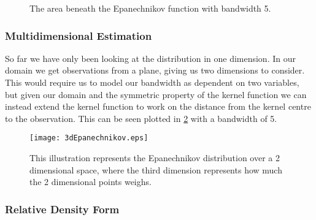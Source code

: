 \begin{figure}[htbp]
\centering
{}
\caption{The area beneath the Epanechnikov function with bandwidth 5.}
\label{fig:1dEpanechnikovDistributionWithHPlot}
\end{figure}

\subsubsection{Multidimensional Estimation}

So far we have only been looking at the distribution in one dimension. In our domain we get observations from a plane, giving us two dimensions to consider. This would require us to model our bandwidth as dependent on two variables, but given our domain and the symmetric property of the kernel function we can instead extend the kernel function to work on the distance from the kernel centre to the observation. This can be seen plotted in \cref{fig:3dEpanechnikov} with a bandwidth of 5.

\begin{figure}[htbp]
\centering
    \texttt{[image: 3dEpanechnikov.eps]}
    \caption[Epanechnikov in 2 dimensions]{This illustration represents the Epanechnikov distribution over a 2 dimensional space, where the third dimension represents how much the 2 dimensional points weighs.}
    \label{fig:3dEpanechnikov}
\end{figure}

\subsubsection{Relative Density Form}

